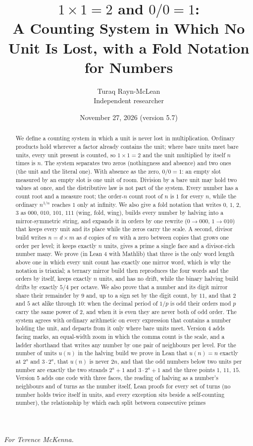 \documentclass[11pt]{article}
\title{$1\times1 = 2$ and $0/0 = 1$:\\[4pt]\large A Counting System in Which No Unit Is Lost, with a Fold Notation for Numbers}
\author{Turaq Rayn-McLean\\Independent researcher}
\date{November 27, 2026 (version 5.7)}
\begin{document}
\maketitle
\begin{center}\emph{For Terence McKenna.}\end{center}

\begin{abstract}
We define a counting system in which a unit is never lost in multiplication. Ordinary products hold wherever a factor already contains the unit; where bare units meet bare units, every unit present is counted, so $1\times1 = 2$ and the unit multiplied by itself $n$ times is $n$. The system separates two zeros (nothingness and absence) and two ones (the unit and the literal one). With absence as the zero, $0/0 = 1$: an empty slot measured by an empty slot is one unit of room. Division by a bare unit may hold two values at once, and the distributive law is not part of the system. Every number has a count root and a measure root; the order-$n$ count root of $n$ is $1$ for every $n$, while the ordinary $n^{1/n}$ reaches $1$ only at infinity. We also give a fold notation that writes $0$, $1$, $2$, $3$ as $000$, $010$, $101$, $111$ (wing, fold, wing), builds every number by halving into a mirror-symmetric string, and expands it in orders by one rewrite ($0\to000$, $1\to010$) that keeps every unit and its place while the zeros carry the scale. A second, divisor build writes $n = d\times m$ as $d$ copies of $m$ with a zero between copies that grows one order per level; it keeps exactly $n$ units, gives a prime a single face and a divisor-rich number many. We prove (in Lean 4 with Mathlib) that three is the only word length above one in which every unit count has exactly one mirror word, which is why the notation is triaxial; a ternary mirror build then reproduces the four words and the orders by itself, keeps exactly $n$ units, and has no drift, while the binary halving build drifts by exactly $5/4$ per octave. We also prove that a number and its digit mirror share their remainder by $9$ and, up to a sign set by the digit count, by $11$, and that $2$ and $5$ act alike through $10$: when the decimal period of $1/p$ is odd their orders mod $p$ carry the same power of $2$, and when it is even they are never both of odd order. The system agrees with ordinary arithmetic on every expression that contains a number holding the unit, and departs from it only where bare units meet. Version 4 adds facing marks, an equal-width zoom in which the comma count is the scale, and a ladder shorthand that writes any number by one pair of neighbours per level. For the number of units $u(n)$ in the halving build we prove in Lean that $u(n) = n$ exactly at $2^a$ and $3\cdot2^a$, that $u(n)$ is never $2n$, and that the odd numbers below two units per number are exactly the two strands $2^a+1$ and $3\cdot2^a+1$ and the three points $1$, $11$, $15$. Version 5 adds one code with three faces, the reading of halving as a number's neighbours and of turns as the number itself, Lean proofs for every set of turns (no number holds twice itself in units, and every exception sits beside a self-counting number), the relationship by which each split between consecutive primes 
\end{abstract}
\end{document}
